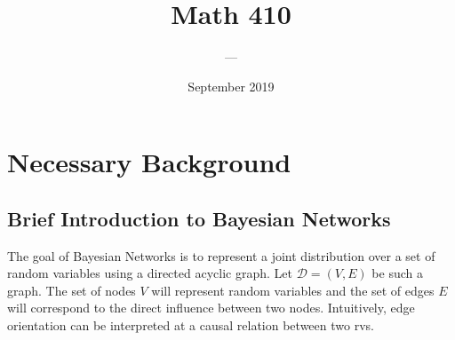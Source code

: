 \documentclass[12pt]{article}
\title{Math 410}
\author{--- }
\date{September 2019}
\theoremstyle{definition}
\begin{document}
\maketitle
\tableofcontents{}
\pagebreak

\section{Necessary Background }

\subsection{Brief Introduction to Bayesian Networks}
The goal of Bayesian Networks is to represent a joint distribution over a set of random variables using a directed acyclic graph. Let $\mathcal{D}=(V,E)$ be such a graph. The set of nodes $V$ will represent random variables and the set of edges $E$ will correspond to the direct influence between two nodes. Intuitively, edge orientation can be interpreted at a causal relation between two rvs.
\end{document}
